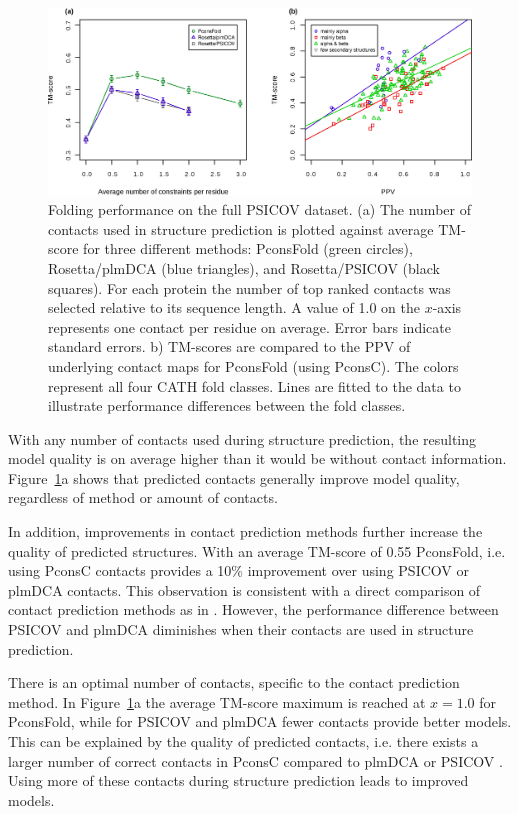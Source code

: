 \documentclass{bioinfo}
\begin{document}
\begin{figure}[!tpb]%
\centerline{\includegraphics[scale=0.7]{figures/tmscores.eps}}
\caption{Folding performance on the full PSICOV dataset. (a) The 
 number of contacts used in structure prediction is
 plotted against average TM-score for three different methods:
 PconsFold (green circles), Rosetta/plmDCA (blue triangles), and
 Rosetta/PSICOV (black squares). For each protein the number of top
 ranked contacts was selected relative to its sequence length. A value
 of 1.0 on the $x$-axis represents one
 contact per residue on average. {\color{red}Error bars indicate
 standard errors.} b) TM-scores are compared
 to the PPV of underlying contact maps for PconsFold (using
 PconsC). The colors represent all four CATH fold classes. Lines 
 are fitted to the data to illustrate performance differences between the fold classes.}\label{fig:main}
\end{figure}

With any number of contacts used during structure prediction, the
resulting model quality is on average higher than it would be without
contact information. Figure~\ref{fig:main}a shows that predicted contacts generally improve model
quality, regardless of method or amount of contacts. 


{\color{red}In addition, improvements in contact prediction methods further increase the quality
of predicted structures.} With an average TM-score of 0.55
PconsFold, i.e. using PconsC contacts provides a 10\% improvement
over using PSICOV or plmDCA contacts. This observation is consistent
with a direct comparison of contact prediction methods as in
\citeauthor{skwark_PconsC:_2013}
\citeyear{skwark_PconsC:_2013}. However, the performance difference
between PSICOV and plmDCA diminishes when their contacts are used in
structure prediction. 


There is an optimal number of contacts, specific to the contact
prediction method. In Figure~\ref{fig:main}a the average TM-score
maximum is reached at $x=1.0$ for PconsFold, while for PSICOV and
plmDCA fewer contacts provide better models. This can be explained by
the quality of predicted contacts, i.e. there exists a larger number of
correct contacts in PconsC compared to plmDCA or PSICOV \cite[]{skwark_PconsC:_2013}. Using more of these contacts during
structure prediction leads to improved models.
\end{document}
